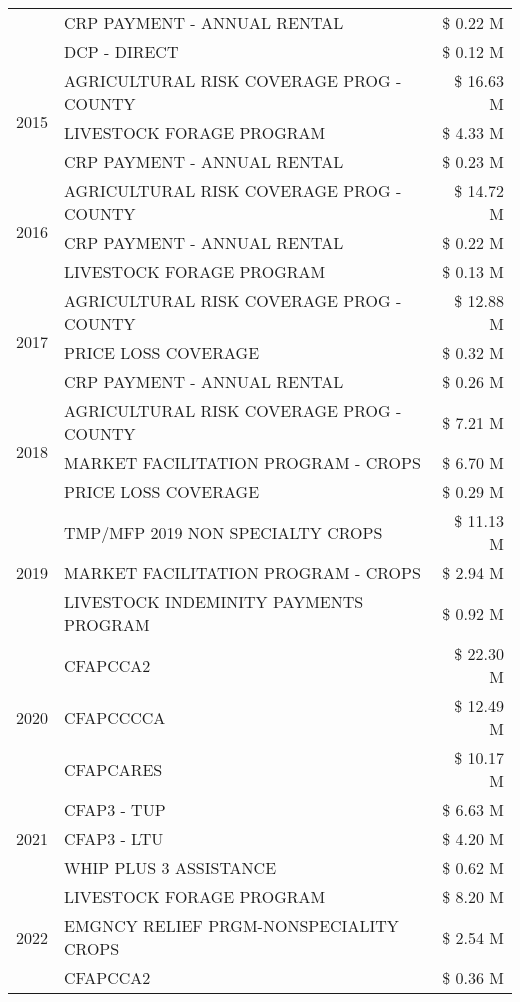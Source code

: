 \begin{tabular}{llr}
 & CRP PAYMENT - ANNUAL RENTAL & \$ 0.22 M \\
 & DCP - DIRECT & \$ 0.12 M \\
\cline{1-3}
\multirow[t]{3}{*}{2015} & AGRICULTURAL RISK COVERAGE PROG - COUNTY & \$ 16.63 M \\
 & LIVESTOCK FORAGE PROGRAM & \$ 4.33 M \\
 & CRP PAYMENT - ANNUAL RENTAL & \$ 0.23 M \\
\cline{1-3}
\multirow[t]{3}{*}{2016} & AGRICULTURAL RISK COVERAGE PROG - COUNTY & \$ 14.72 M \\
 & CRP PAYMENT - ANNUAL RENTAL & \$ 0.22 M \\
 & LIVESTOCK FORAGE PROGRAM & \$ 0.13 M \\
\cline{1-3}
\multirow[t]{3}{*}{2017} & AGRICULTURAL RISK COVERAGE PROG - COUNTY & \$ 12.88 M \\
 & PRICE LOSS COVERAGE & \$ 0.32 M \\
 & CRP PAYMENT - ANNUAL RENTAL & \$ 0.26 M \\
\cline{1-3}
\multirow[t]{3}{*}{2018} & AGRICULTURAL RISK COVERAGE PROG - COUNTY & \$ 7.21 M \\
 & MARKET FACILITATION PROGRAM - CROPS & \$ 6.70 M \\
 & PRICE LOSS COVERAGE & \$ 0.29 M \\
\cline{1-3}
\multirow[t]{3}{*}{2019} & TMP/MFP 2019 NON SPECIALTY CROPS & \$ 11.13 M \\
 & MARKET FACILITATION PROGRAM - CROPS & \$ 2.94 M \\
 & LIVESTOCK INDEMINITY PAYMENTS PROGRAM & \$ 0.92 M \\
\cline{1-3}
\multirow[t]{3}{*}{2020} & CFAPCCA2 & \$ 22.30 M \\
 & CFAPCCCCA & \$ 12.49 M \\
 & CFAPCARES & \$ 10.17 M \\
\cline{1-3}
\multirow[t]{3}{*}{2021} & CFAP3 - TUP & \$ 6.63 M \\
 & CFAP3 - LTU & \$ 4.20 M \\
 & WHIP PLUS 3 ASSISTANCE & \$ 0.62 M \\
\cline{1-3}
\multirow[t]{3}{*}{2022} & LIVESTOCK FORAGE PROGRAM & \$ 8.20 M \\
 & EMGNCY RELIEF PRGM-NONSPECIALITY CROPS & \$ 2.54 M \\
 & CFAPCCA2 & \$ 0.36 M \\
\cline{1-3}
\bottomrule
\end{tabular}
